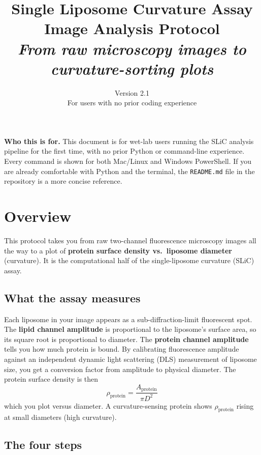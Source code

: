 \documentclass[11pt]{article}
\title{
    \vspace{-1cm}
    \Huge \textbf{Single Liposome Curvature Assay} \\[0.3cm]
    \LARGE Image Analysis Protocol \\[0.2cm]
    \large \textit{From raw microscopy images to curvature-sorting plots}
}
\author{}
\date{Version 2.1 \\ For users with no prior coding experience}
\begin{document}
\maketitle
\thispagestyle{empty}

\vspace{1cm}

\begin{notebox}
\textbf{Who this is for.} This document is for wet-lab users running
the SLiC analysis pipeline for the first time, with no prior Python or
command-line experience. Every command is shown for both Mac/Linux and
Windows PowerShell. If you are already comfortable with Python and the
terminal, the \texttt{README.md} file in the repository is a more
concise reference.
\end{notebox}

\newpage

\tableofcontents
\newpage

\section{Overview}

This protocol takes you from raw two-channel fluorescence microscopy
images all the way to a plot of \textbf{protein surface density vs.\
liposome diameter} (curvature). It is the computational half of the
single-liposome curvature (SLiC) assay.

\subsection*{What the assay measures}

Each liposome in your image appears as a sub-diffraction-limit
fluorescent spot. The \textbf{lipid channel amplitude} is proportional
to the liposome's surface area, so its square root is proportional to
diameter. The \textbf{protein channel amplitude} tells you how much
protein is bound. By calibrating fluorescence amplitude against an
independent dynamic light scattering (DLS) measurement of liposome
size, you get a conversion factor from amplitude to physical diameter.
The protein surface density is then
\[
\rho_{\text{protein}} = \frac{A_{\text{protein}}}{\pi D^2}
\]
which you plot versus diameter. A curvature-sensing protein shows
$\rho_{\text{protein}}$ rising at small diameters (high curvature).

\subsection*{The four steps}
\end{document}
